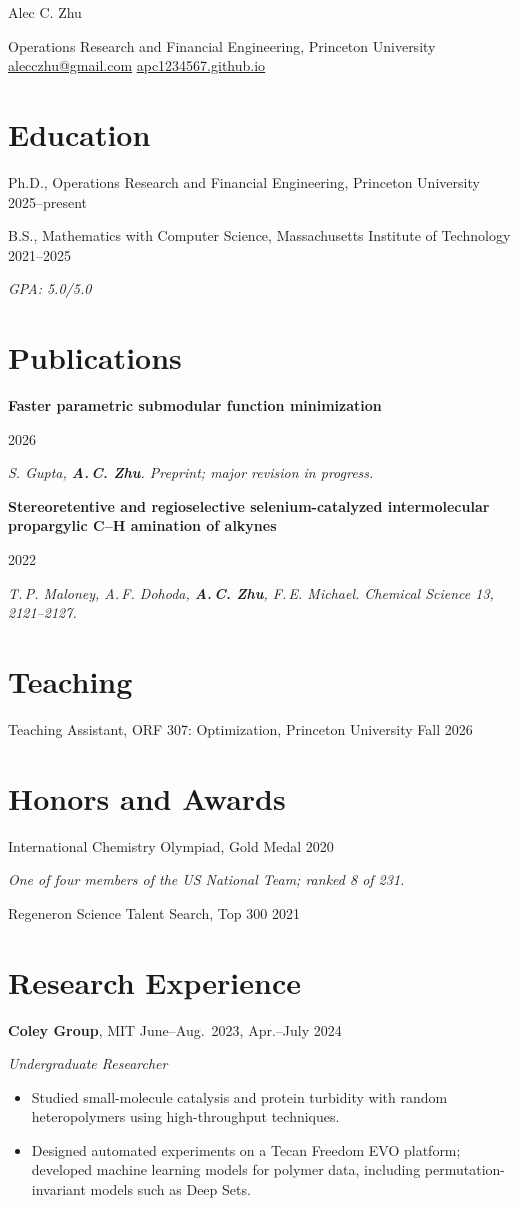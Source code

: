 \documentclass[11pt]{article}
\newcommand{\entry}[2]{\needspace{4\baselineskip}\noindent #1 \hfill {\color{mist}#2}\par}
\newcommand{\detail}[1]{{\color{mist}\itshape #1}\par\vspace{0.6em}}
\newcommand{\role}[1]{{\color{mist}\itshape #1}\par}
\begin{document}
{\LARGE Alec C. Zhu}\par
\vspace{0.4em}
{\color{mist}
Operations Research and Financial Engineering, Princeton University\\
\href{mailto:alecczhu@gmail.com}{alecczhu@gmail.com} \quad
\href{https://apc1234567.github.io}{apc1234567.github.io}}

\section{Education}
\entry{Ph.D., Operations Research and Financial Engineering, Princeton University}{2025--present}
\vspace{0.6em}
\entry{B.S., Mathematics with Computer Science, Massachusetts Institute of Technology}{2021--2025}
\detail{GPA: 5.0/5.0}

\section{Publications}
\entry{\parbox[t]{0.85\linewidth}{\raggedright\textbf{Faster parametric submodular function minimization}}}{2026}
\detail{S. Gupta, \textbf{A.\,C. Zhu}. Preprint; major revision in progress.}
\entry{\parbox[t]{0.85\linewidth}{\raggedright\textbf{Stereoretentive and regioselective selenium-catalyzed intermolecular propargylic C–H amination of alkynes}}}{2022}
\detail{T.\,P. Maloney, A.\,F. Dohoda, \textbf{A.\,C. Zhu}, F.\,E. Michael. \textit{Chemical Science} 13, 2121--2127.}

\section{Teaching}
\entry{Teaching Assistant, ORF 307: Optimization, Princeton University}{Fall 2026}

\section{Honors and Awards}
\entry{International Chemistry Olympiad, Gold Medal}{2020}
\detail{One of four members of the US National Team; ranked 8 of 231.}
\entry{Regeneron Science Talent Search, Top 300}{2021}

\section{Research Experience}
\entry{\textbf{Coley Group}, MIT}{June--Aug.\ 2023, Apr.--July 2024}
\role{Undergraduate Researcher}
\begin{itemize}
  \item Studied small-molecule catalysis and protein turbidity with random heteropolymers using high-throughput techniques.
  \item Designed automated experiments on a Tecan Freedom EVO platform; developed machine learning models for polymer data, including permutation-invariant models such as Deep Sets.
\end{itemize}
\end{document}
